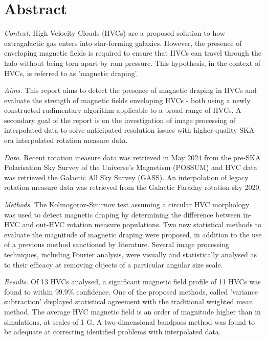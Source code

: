\chapter*{Abstract}

\noindent\textit{Context.} High Velocity Clouds (HVCs) are a proposed solution to how extragalactic gas enters into star-forming galaxies. However, the presence of enveloping magnetic fields is required to ensure that HVCs can travel through the halo without being torn apart by ram pressure. This hypothesis, in the context of HVCs, is referred to as 'magnetic draping'.

\noindent\textit{Aims.} This report aims to detect the presence of magnetic draping in HVCs and evaluate the strength of magnetic fields enveloping HVCs - both using a newly constructed rudimentary algorithm applicable to a broad range of HVCs. A secondary goal of the report is on the investigation of image processing of interpolated data to solve anticipated resolution issues with higher-quality SKA-era interpolated rotation measure data.

\noindent\textit{Data.} Recent rotation measure data was retrieved in May 2024 from the pre-SKA Polarisation Sky Survey of the Universe's Magnetism (POSSUM) and HVC data was retrieved the Galactic All Sky Survey (GASS). An interpolation of legacy rotation measure data was retrieved from the Galactic Faraday rotation sky 2020.

\noindent\textit{Methods.} The Kolmogorov-Smirnov test assuming a circular HVC morphology was used to detect magnetic draping by determining the difference between in-HVC and out-HVC rotation measure populations. Two new statistical methods to evaluate the magnitude of magnetic draping were proposed, in addition to the use of a previous method sanctioned by literature. Several image processing techniques, including Fourier analysis, were visually and statistically analysed as to their efficacy at removing objects of a particular angular size scale.

\noindent\textit{Results.} Of 13 HVCs analysed, a significant magnetic field profile of 11 HVCs was found to within 99.9\% confidence. One of the proposed methods, called 'variance subtraction' displayed statistical agreement with the traditional weighted mean method. The average HVC magnetic field is an order of magnitude higher than in simulations, at scales of 1 \textmu G. A two-dimensional bandpass method was found to be adequate at correcting identified problems with interpolated data.


